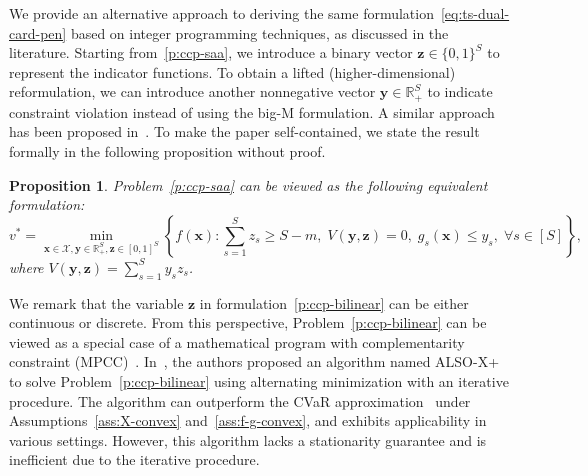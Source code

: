 \documentclass[11pt]{article}
\newtheorem{proposition}[theorem]{Proposition}
\def\bs{\boldsymbol}
\def\Re{\mathbb{R}}
\def\X{\mathcal{X}}
\begin{document}
We provide an alternative approach to deriving the same formulation~\eqref{eq:ts-dual-card-pen} based on integer programming techniques, as discussed in the literature. Starting from~\eqref{p:ccp-saa}, we introduce a binary vector $\bs{z}\in\{0,1\}^S$ to represent the indicator functions. 
To obtain a lifted (higher-dimensional) reformulation, we can introduce another nonnegative vector $\bs{y} \in \Re^S_+$ to indicate constraint violation instead of using the big-M formulation. A similar approach has been proposed in~\cite{jiang2022also}. To make the paper self-contained, we state the result formally in the following proposition without proof.

\begin{proposition}{\cite[proposition 1]{jiang2022also}}
Problem~\eqref{p:ccp-saa} can be viewed as the following equivalent formulation:
\begin{equation} \label{p:ccp-bilinear}
v^* =  \min_{\bs{x} \in \X, \bs{y}\in\Re^S_+, \bs{z} \in [0,1]^S} \left\{ f(\bs{x}): \sum^S_{s=1}z_s \geq S-m, \; V(\bs{y}, \bs{z}) = 0, \; g_s(\bs{x}) \leq y_s, \;\forall s \in [S]  \right\},
\end{equation}
where $V(\bs{y}, \bs{z}) = \sum_{s=1}^S y_sz_s$.
\end{proposition}

We remark that the variable $\bs{z}$ in formulation~\eqref{p:ccp-bilinear} can be either continuous or discrete. From this perspective, Problem~\eqref{p:ccp-bilinear} can be viewed as a special case of a mathematical program with complementarity constraint (MPCC)~\cite{leyffer2003mathematical, scheel2000mathematical}.  In~\cite{jiang2022also}, the authors proposed an algorithm named ALSO-X+ to solve Problem~\eqref{p:ccp-bilinear} using alternating minimization with an iterative procedure. The algorithm can outperform the CVaR approximation~\cite{rockafellar2002conditional} under Assumptions~\ref{ass:X-convex} and~\ref{ass:f-g-convex}, and exhibits applicability in various settings. However, this algorithm lacks a stationarity guarantee and is inefficient due to the iterative procedure.
\end{document}
